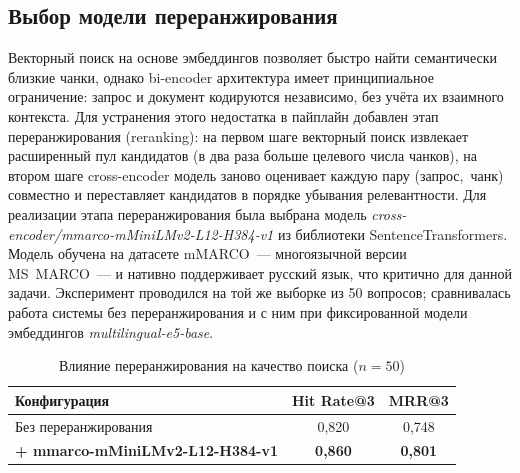 \documentclass{article}
\begin{document}


\subsection{Выбор модели переранжирования}

Векторный поиск на основе эмбеддингов позволяет быстро найти семантически близкие чанки, однако bi-encoder архитектура имеет принципиальное ограничение: запрос и документ кодируются независимо, без учёта их взаимного контекста. Для устранения этого недостатка в пайплайн добавлен этап переранжирования (reranking): на первом шаге векторный поиск извлекает расширенный пул кандидатов (в два раза больше целевого числа чанков), на втором шаге cross-encoder модель заново оценивает каждую пару (запрос,~чанк) совместно и переставляет кандидатов в порядке убывания релевантности. Для реализации этапа переранжирования была выбрана модель \textit{cross-encoder/mmarco-mMiniLMv2-L12-H384-v1} из библиотеки SentenceTransformers. Модель обучена на датасете mMARCO~--- многоязычной версии MS~MARCO~--- и нативно поддерживает русский язык, что критично для данной задачи. Эксперимент проводился на той же выборке из 50 вопросов; сравнивалась работа системы без переранжирования и с ним при фиксированной модели эмбеддингов \textit{multilingual-e5-base}.

\begin{table}[H]
\centering
\begin{tabular}{lcc}
\hline
\textbf{Конфигурация} & \textbf{Hit Rate@3} & \textbf{MRR@3} \\
\hline
Без переранжирования                             & 0{,}820 & 0{,}748 \\
\textbf{+ mmarco-mMiniLMv2-L12-H384-v1}         & \textbf{0{,}860} & \textbf{0{,}801} \\
\hline
\end{tabular}
\caption{Влияние переранжирования на качество поиска ($n = 50$)}
\label{tab:reranker_comparison}
\end{table}
\end{document}
